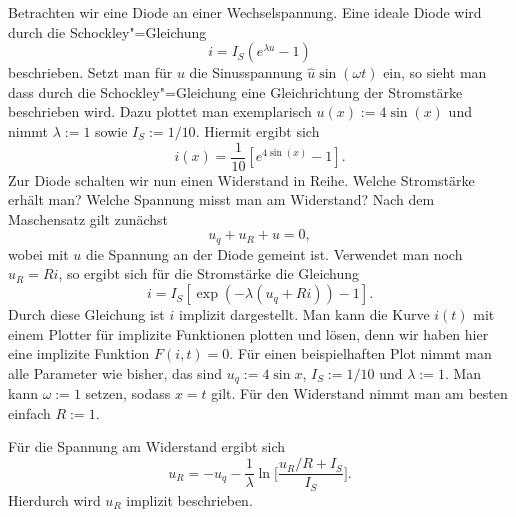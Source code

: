 \documentclass[a4paper,10pt,fleqn,twocolumn,twoside,dvipdfmx]{scrartcl}
\numberwithin{equation}{section}
\begin{document}
\noindent
Betrachten wir eine Diode an einer Wechselspannung. Eine ideale
Diode wird durch die Schockley"=Gleichung%
\begin{equation}
i=I_S(e^{\lambda u}-1)
\end{equation}
beschrieben. Setzt man für $u$ die Sinusspannung
$\hat u\sin(\omega t)$ ein, so sieht man dass durch die
Schockley"=Gleichung eine Gleichrichtung der Stromstärke
beschrieben wird. Dazu plottet man exemplarisch
$u(x):=4\sin(x)$ und nimmt $\lambda:=1$ sowie $I_S:=1/10$.
Hiermit ergibt sich%
\begin{equation}
i(x)=\frac{1}{10}[e^{4\sin(x)}-1].
\end{equation}
Zur Diode schalten wir nun einen Widerstand in Reihe.
Welche Stromstärke erhält man? Welche Spannung misst man am
Widerstand? Nach dem Maschensatz gilt zunächst%
\begin{equation}
u_q+u_R+u=0,
\end{equation}
wobei mit $u$ die Spannung an der Diode gemeint ist.
Verwendet man noch $u_R=Ri$, so ergibt sich
für die Stromstärke die Gleichung%
\begin{equation}\label{eq:impliziti}
i=I_S[\exp(-\lambda(u_q+Ri))-1].
\end{equation}
Durch diese Gleichung ist $i$ implizit dargestellt. Man kann
die Kurve $i(t)$ mit einem Plotter für implizite Funktionen
plotten und lösen, denn wir haben hier eine implizite
Funktion $F(i,t)=0$. Für einen
beispielhaften Plot nimmt man alle Parameter wie bisher, das
sind $u_q:=4\sin x$, $I_S:=1/10$ und
$\lambda:=1$. Man kann $\omega:=1$ setzen, sodass $x=t$ gilt.
Für den Widerstand nimmt man am besten einfach $R:=1$.

Für die Spannung am Widerstand ergibt sich%
\begin{equation}\label{eq:DiodeuR}
u_R = -u_q -\frac{1}{\lambda}\ln\Big[\frac{u_R/R+I_S}{I_S}\Big].
\end{equation}
Hierdurch wird $u_R$ implizit beschrieben.
\end{document}
